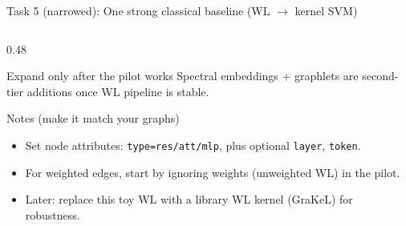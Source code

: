 \documentclass[aspectratio=169,xcolor={dvipsnames}]{beamer}
\begin{document}
\begin{frame}[fragile,shrink=34]{Task 5 (narrowed): One strong classical baseline (WL $\rightarrow$ kernel SVM)}
\begin{columns}[T,onlytextwidth]
\begin{column}{0.48\textwidth}
\vspace{1mm}

\vspace{1mm}
\begin{block}{Expand only after the pilot works}
\footnotesize
Spectral embeddings + graphlets are second-tier additions once WL pipeline is stable.
\end{block}

\begin{block}{Notes (make it match your graphs)}
\footnotesize
\begin{itemize}\setlength\itemsep{2pt}
\item Set node attributes: \texttt{type=res/att/mlp}, plus optional \texttt{layer}, \texttt{token}.
\item For weighted edges, start by ignoring weights (unweighted WL) in the pilot.
\item Later: replace this toy WL with a library WL kernel (GraKeL) for robustness.
\end{itemize}
\end{block}
\end{column}
\end{columns}
\end{frame}
\end{document}

